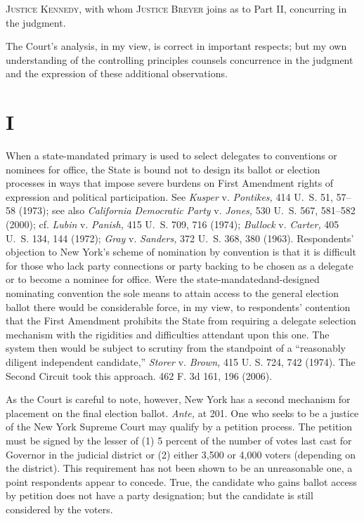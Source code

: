 
\setcounter{page}{209}

  \textsc{Justice Kennedy,} with whom \textsc{Justice Breyer} joins as to Part II, concurring in the judgment.

  The Court's analysis, in my view, is correct in important respects; but my own understanding of the controlling principles counsels concurrence in the judgment and the expression of these additional observations. \newpage 

\section{I}

   When a state-mandated primary is used to select delegates to conventions or nominees for office, the State is bound not to design its ballot or election processes in ways that impose severe burdens on First Amendment rights of expression and political participation. See \emph{Kusper} v. \emph{Pontikes,} 414 U.~S. 51, 57--58 (1973); see also \emph{California Democratic Party} v. \emph{Jones,} 530 U.~S. 567, 581--582 (2000); cf. \emph{Lubin} v. \emph{Panish,} 415 U.~S. 709, 716 (1974); \emph{Bullock} v. \emph{Carter,} 405 U.~S. 134, 144 (1972); \emph{Gray} v. \emph{Sanders,} 372 U.~S. 368, 380 (1963). Respondents' objection to New York's scheme of nomination by convention is that it is difficult for those who lack party connections or party backing to be chosen as a delegate or to become a nominee for office. Were the state-mandatedand-designed nominating convention the sole means to attain access to the general election ballot there would be considerable force, in my view, to respondents' contention that the First Amendment prohibits the State from requiring a delegate selection mechanism with the rigidities and difficulties attendant upon this one. The system then would be subject to scrutiny from the standpoint of a ``reasonably diligent independent candidate,'' \emph{Storer} v. \emph{Brown,} 415 U. S. 724, 742 (1974). The Second Circuit took this approach. 462 F. 3d 161, 196 (2006).

  As the Court is careful to note, however, New York has a second mechanism for placement on the final election ballot. \emph{Ante,} at 201. One who seeks to be a justice of the New York Supreme Court may qualify by a petition process. The petition must be signed by the lesser of (1) 5 percent of the number of votes last cast for Governor in the judicial district or (2) either 3,500 or 4,000 voters (depending on the district). This requirement has not been shown to be an unreasonable one, a point respondents appear to concede. True, the candidate who gains ballot access by petition does not have a party designation; but the candidate is still considered by the voters.\newpage 

